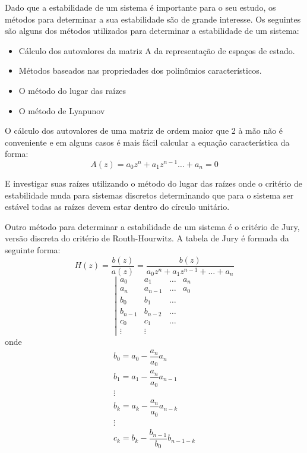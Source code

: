 Dado que a estabilidade de um sistema é importante para o seu estudo, os métodos para determinar a sua estabilidade são de grande interesse. Os seguintes são alguns dos métodos utilizados para determinar a estabilidade de um sistema:
\begin{itemize}
	\item Cálculo dos autovalores da matriz A da representação de espaços de estado.
	\item Métodos baseados nas propriedades dos polinômios característicos.
	\item O método do lugar das raízes
	\item O método de Lyapunov
\end{itemize}

O cálculo dos autovalores de uma matriz de ordem maior que 2 à mão não é conveniente e em alguns casos é mais fácil calcular a equação característica da forma:
\begin{equation}
A(z)=a_0z^n+a_1z^{n-1}\dots+a_n=0
\end{equation}

E investigar suas raízes utilizando o método do lugar das raízes onde o critério de estabilidade muda para sistemas discretos determinando que para o sistema ser estável todas as raízes devem estar dentro do círculo unitário.

Outro método para determinar a estabilidade de um sistema é o critério de Jury, versão discreta do critério de Routh-Hourwitz. A tabela de Jury é formada da seguinte forma:
\begin{equation}
H(z)=\dfrac{b(z)}{a(z)}=\dfrac{b(z)}{a_0 z^n+a_1 z^{n-1}+\dots+a_n}
\end{equation}
\begin{equation}
\left|
\begin{matrix}
a_0 & a_1& \dots & a_n\\
a_n & a_{n-1}& \dots & a_0\\
b_0 & b_1 & \dots \\
b_{n-1} & b_{n-2} & \dots \\
c_0 & c_1 & \dots \\
\vdots & \vdots
\end{matrix}
\right.
\end{equation}
onde
\begin{equation}
\begin{matrix}
b_0=a_0- \dfrac{a_n}{a_0}a_n\\
b_1=a_1- \dfrac{a_n}{a_0}a_{n-1}\\
\vdots \\
b_k=a_k- \dfrac{a_n}{a_0}a_{n-k}\\
\vdots \\
c_k=b_k- \dfrac{b_{n-1}}{b_0}b_{n-1-k}\\
\end{matrix}
\end{equation}

